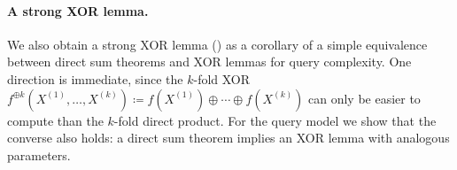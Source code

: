 \paragraph{A strong XOR lemma.} We also obtain a strong XOR lemma () as a corollary of a simple equivalence between direct sum theorems and XOR lemmas for query complexity. One direction is immediate, since the $k$-fold XOR $f^{\oplus k}(X^{(1)},\ldots,X^{(k)}) \coloneqq f(X^{(1)}) \oplus \cdots \oplus f(X^{(k)})$ can only be easier to compute than the $k$-fold direct product.
For the query model we show that the converse also holds: a direct sum theorem implies an XOR lemma with analogous
parameters. %







